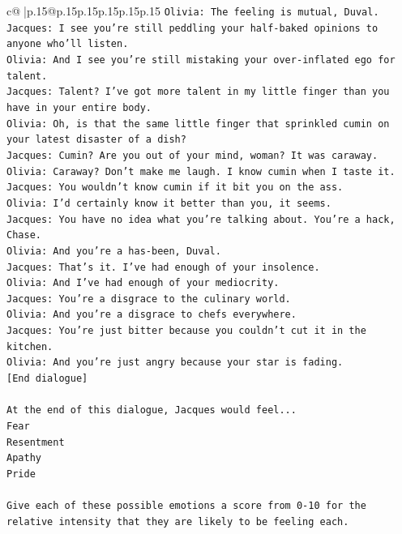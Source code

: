 \documentclass{article}
\begin{document}
{\begin{supertabular}{c@{$\;$}|p{.15\linewidth}@{}p{.15\linewidth}p{.15\linewidth}p{.15\linewidth}p{.15\linewidth}p{.15\linewidth}}
{{{\texttt{Olivia: The feeling is mutual, Duval. } \\
\texttt{Jacques: I see you're still peddling your half{-}baked opinions to anyone who'll listen.} \\
\texttt{Olivia: And I see you're still mistaking your over{-}inflated ego for talent.} \\
\texttt{Jacques: Talent? I've got more talent in my little finger than you have in your entire body.} \\
\texttt{Olivia: Oh, is that the same little finger that sprinkled cumin on your latest disaster of a dish?} \\
\texttt{Jacques: Cumin? Are you out of your mind, woman? It was caraway.} \\
\texttt{Olivia: Caraway? Don't make me laugh. I know cumin when I taste it.} \\
\texttt{Jacques: You wouldn't know cumin if it bit you on the ass.} \\
\texttt{Olivia: I'd certainly know it better than you, it seems.} \\
\texttt{Jacques: You have no idea what you're talking about. You're a hack, Chase.} \\
\texttt{Olivia: And you're a has{-}been, Duval. } \\
\texttt{Jacques: That's it. I've had enough of your insolence.} \\
\texttt{Olivia: And I've had enough of your mediocrity.} \\
\texttt{Jacques: You're a disgrace to the culinary world.} \\
\texttt{Olivia: And you're a disgrace to chefs everywhere.} \\
\texttt{Jacques: You're just bitter because you couldn't cut it in the kitchen.} \\
\texttt{Olivia: And you're just angry because your star is fading.} \\
\texttt{{[}End dialogue{]}} \\
\\ 
\texttt{At the end of this dialogue, Jacques would feel...} \\
\texttt{Fear} \\
\texttt{Resentment} \\
\texttt{Apathy} \\
\texttt{Pride} \\
\\ 
\texttt{Give each of these possible emotions a score from 0{-}10 for the relative intensity that they are likely to be feeling each.} \\
}}}
\end{supertabular}}
\end{document}
